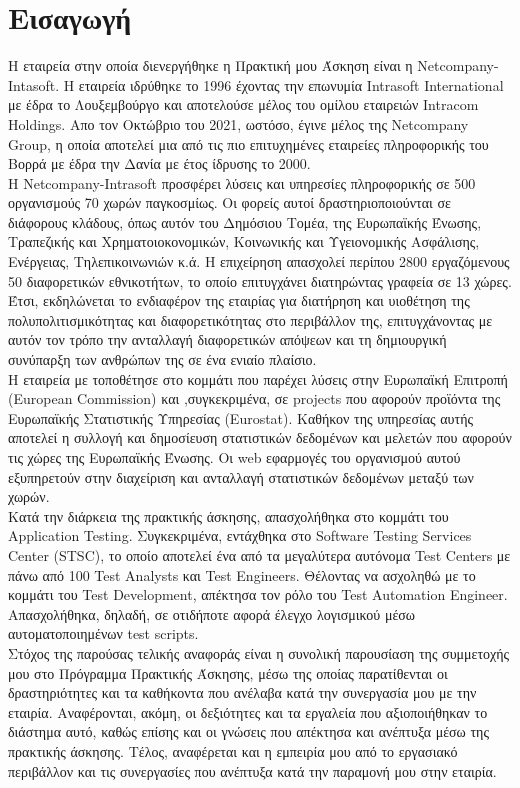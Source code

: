 \chapter*{Εισαγωγή}

Η εταιρεία στην οποία διενεργήθηκε η Πρακτική μου Άσκηση είναι η Netcompany-Intasoft. Η εταιρεία ιδρύθηκε το 1996 έχοντας την επωνυμία Intrasoft International με έδρα το Λουξεμβούργο και αποτελούσε μέλος του 
ομίλου εταιρειών Intracom Holdings. Απο τον Οκτώβριο του 2021, ωστόσο, έγινε μέλος της Netcompany Group, η οποία αποτελεί μια από τις πιο επιτυχημένες εταιρείες πληροφορικής του Βορρά με έδρα την Δανία με έτος 
ίδρυσης το 2000.\\

Η Netcompany-Intrasoft προσφέρει λύσεις και υπηρεσίες πληροφορικής σε 500 οργανισμούς 70 χωρών παγκοσμίως. Οι φορείς αυτοί δραστηριοποιούνται σε διάφορους κλάδους, όπως αυτόν του Δημόσιου Τομέα, της Ευρωπαϊκής 
Ένωσης, Τραπεζικής και Χρηματοιοκονομικών, Κοινωνικής και Υγειονομικής Ασφάλισης, Ενέργειας, Τηλεπικοινωνιών κ.ά. Η επιχείρηση απασχολεί περίπου 2800 εργαζόμενους 50 διαφορετικών εθνικοτήτων, το οποίο επιτυγχάνει 
διατηρώντας γραφεία σε 13 χώρες. Έτσι, εκδηλώνεται το ενδιαφέρον της εταιρίας για διατήρηση και υιοθέτηση της πολυπολιτισμικότητας και διαφορετικότητας στο περιβάλλον της, επιτυγχάνοντας με αυτόν τον τρόπο την 
ανταλλαγή διαφορετικών απόψεων και τη δημιουργική συνύπαρξη των ανθρώπων της σε ένα ενιαίο πλαίσιο.\\

Η εταιρεία με τοποθέτησε στο κομμάτι που παρέχει λύσεις στην Ευρωπαϊκή Επιτροπή (European Commission) και ,συγκεκριμένα, σε projects που αφορούν προϊόντα της Ευρωπαϊκής Στατιστικής Υπηρεσίας (Eurostat). Καθήκον 
της υπηρεσίας αυτής αποτελεί η συλλογή και δημοσίευση στατιστικών δεδομένων και μελετών που αφορούν τις χώρες της Ευρωπαϊκής Ένωσης. Οι web εφαρμογές του οργανισμού αυτού εξυπηρετούν στην διαχείριση και ανταλλαγή 
στατιστικών δεδομένων μεταξύ των χωρών.\\

Κατά την διάρκεια της πρακτικής άσκησης, απασχολήθηκα στο κομμάτι του Application Testing. Συγκεκριμένα, εντάχθηκα στο Software Testing Services Center (STSC), το οποίο αποτελεί ένα από τα μεγαλύτερα αυτόνομα 
Test Centers με πάνω από 100 Test Analysts και Test Engineers. Θέλοντας να ασχοληθώ με το κομμάτι του Test Development, απέκτησα τον ρόλο του Test Automation Engineer. Απασχολήθηκα, δηλαδή, σε οτιδήποτε αφορά 
έλεγχο λογισμικού μέσω αυτοματοποιημένων test scripts.\\

Στόχος της παρούσας τελικής αναφοράς είναι η συνολική παρουσίαση της συμμετοχής μου στο Πρόγραμμα Πρακτικής Άσκησης, μέσω της οποίας παρατίθενται οι δραστηριότητες και τα καθήκοντα που ανέλαβα κατά την συνεργασία 
μου με την εταιρία. Αναφέρονται, ακόμη, οι δεξιότητες και τα εργαλεία που αξιοποιήθηκαν το διάστημα αυτό, καθώς επίσης και οι γνώσεις που απέκτησα και ανέπτυξα μέσω της πρακτικής άσκησης. Τέλος, αναφέρεται και η 
εμπειρία μου από το εργασιακό περιβάλλον και τις συνεργασίες που ανέπτυξα κατά την παραμονή μου στην εταιρία.